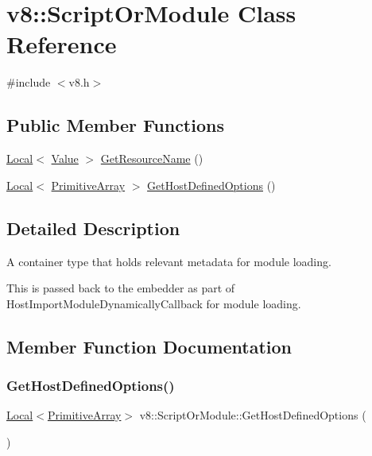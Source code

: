 \hypertarget{classv8_1_1ScriptOrModule}{}\section{v8\+:\+:Script\+Or\+Module Class Reference}
\label{classv8_1_1ScriptOrModule}


{\ttfamily \#include $<$v8.\+h$>$}

\subsection*{Public Member Functions}
\begin{DoxyCompactItemize}
\item 
\mbox{\hyperlink{classv8_1_1Local}{Local}}$<$ \mbox{\hyperlink{classv8_1_1Value}{Value}} $>$ \mbox{\hyperlink{classv8_1_1ScriptOrModule_a6e35d9dc6e0c22ed4d8c1de071b3b9d9}{Get\+Resource\+Name}} ()
\item 
\mbox{\hyperlink{classv8_1_1Local}{Local}}$<$ \mbox{\hyperlink{classv8_1_1PrimitiveArray}{Primitive\+Array}} $>$ \mbox{\hyperlink{classv8_1_1ScriptOrModule_a955fc0a8db835119363af6df91e2e08d}{Get\+Host\+Defined\+Options}} ()
\end{DoxyCompactItemize}


\subsection{Detailed Description}
A container type that holds relevant metadata for module loading.

This is passed back to the embedder as part of Host\+Import\+Module\+Dynamically\+Callback for module loading. 

\subsection{Member Function Documentation}
\mbox{\label{classv8_1_1ScriptOrModule_a955fc0a8db835119363af6df91e2e08d}} 
\subsubsection{\texorpdfstring{Get\+Host\+Defined\+Options()}{GetHostDefinedOptions()}}
{\footnotesize\ttfamily \mbox{\hyperlink{classv8_1_1Local}{Local}}$<$\mbox{\hyperlink{classv8_1_1PrimitiveArray}{Primitive\+Array}}$>$ v8\+::\+Script\+Or\+Module\+::\+Get\+Host\+Defined\+Options (\begin{DoxyParamCaption}{ }\end{DoxyParamCaption})}

